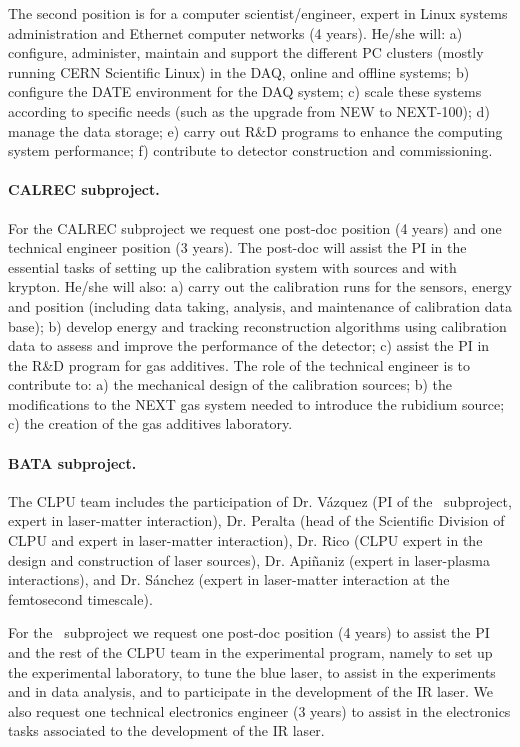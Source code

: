 The second position is for a computer scientist/engineer, expert in Linux systems administration and Ethernet computer networks (4 years). He/she will: a) configure, administer, maintain and support the different PC clusters (mostly running CERN Scientific Linux) in the DAQ, online and offline systems; b) configure the DATE environment for the DAQ system; c) scale these systems according to specific needs (such as the upgrade from NEW to NEXT-100); d) manage the data storage; e) carry out R\&D programs to enhance the computing system performance; f) contribute to detector construction and commissioning. 

\paragraph{CALREC subproject.}

For the CALREC subproject we request one post-doc position (4 years) and one technical engineer position (3 years). The post-doc will assist the PI in the essential tasks of setting up the calibration system with sources and with krypton. He/she will also: a) carry out the calibration runs for the sensors, energy and position (including data taking, analysis, and maintenance of calibration data base); b) develop energy and tracking reconstruction algorithms using calibration data to assess and improve the performance of the detector; c) assist the PI in the R\&D program for gas additives. The role of the technical engineer is to contribute to: a) the mechanical design of the calibration sources; b) the modifications to the NEXT gas system needed to introduce the rubidium source; c) the creation of the gas additives laboratory. 

\paragraph{BATA subproject.}

The CLPU team includes the participation of Dr. V\'azquez (PI of the \BATA\ subproject, expert in laser-matter interaction), Dr. Peralta (head of the Scientific Division of CLPU and expert in laser-matter interaction), Dr. Rico (CLPU expert in the design and construction of laser sources), Dr. Api\~naniz (expert in laser-plasma interactions), and Dr. S\'anchez (expert in laser-matter interaction at the femtosecond timescale).

For the \BATA\ subproject we request one post-doc position (4 years) to assist the PI and the rest of the CLPU team in the experimental program, namely to set up the experimental laboratory, to tune the blue laser, to assist in the experiments and in data analysis, and to participate in the development of the IR laser. We also request one technical electronics engineer (3 years) to assist in the electronics tasks associated to the development of the IR laser.  

